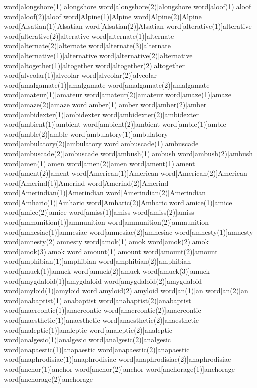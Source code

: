 word[alongshore(1)]{alongshore}
word[alongshore(2)]{alongshore}
word[aloof(1)]{aloof}
word[aloof(2)]{aloof}
word[Alpine(1)]{Alpine}
word[Alpine(2)]{Alpine}
word[Alsatian(1)]{Alsatian}
word[Alsatian(2)]{Alsatian}
word[alterative(1)]{alterative}
word[alterative(2)]{alterative}
word[alternate(1)]{alternate}
word[alternate(2)]{alternate}
word[alternate(3)]{alternate}
word[alternative(1)]{alternative}
word[alternative(2)]{alternative}
word[altogether(1)]{altogether}
word[altogether(2)]{altogether}
word[alveolar(1)]{alveolar}
word[alveolar(2)]{alveolar}
word[amalgamate(1)]{amalgamate}
word[amalgamate(2)]{amalgamate}
word[amateur(1)]{amateur}
word[amateur(2)]{amateur}
word[amaze(1)]{amaze}
word[amaze(2)]{amaze}
word[amber(1)]{amber}
word[amber(2)]{amber}
word[ambidexter(1)]{ambidexter}
word[ambidexter(2)]{ambidexter}
word[ambient(1)]{ambient}
word[ambient(2)]{ambient}
word[amble(1)]{amble}
word[amble(2)]{amble}
word[ambulatory(1)]{ambulatory}
word[ambulatory(2)]{ambulatory}
word[ambuscade(1)]{ambuscade}
word[ambuscade(2)]{ambuscade}
word[ambush(1)]{ambush}
word[ambush(2)]{ambush}
word[amen(1)]{amen}
word[amen(2)]{amen}
word[ament(1)]{ament}
word[ament(2)]{ament}
word[American(1)]{American}
word[American(2)]{American}
word[Amerind(1)]{Amerind}
word[Amerind(2)]{Amerind}
word[Amerindian(1)]{Amerindian}
word[Amerindian(2)]{Amerindian}
word[Amharic(1)]{Amharic}
word[Amharic(2)]{Amharic}
word[amice(1)]{amice}
word[amice(2)]{amice}
word[amiss(1)]{amiss}
word[amiss(2)]{amiss}
word[ammunition(1)]{ammunition}
word[ammunition(2)]{ammunition}
word[amnesiac(1)]{amnesiac}
word[amnesiac(2)]{amnesiac}
word[amnesty(1)]{amnesty}
word[amnesty(2)]{amnesty}
word[amok(1)]{amok}
word[amok(2)]{amok}
word[amok(3)]{amok}
word[amount(1)]{amount}
word[amount(2)]{amount}
word[amphibian(1)]{amphibian}
word[amphibian(2)]{amphibian}
word[amuck(1)]{amuck}
word[amuck(2)]{amuck}
word[amuck(3)]{amuck}
word[amygdaloid(1)]{amygdaloid}
word[amygdaloid(2)]{amygdaloid}
word[amyloid(1)]{amyloid}
word[amyloid(2)]{amyloid}
word[an(1)]{an}
word[an(2)]{an}
word[anabaptist(1)]{anabaptist}
word[anabaptist(2)]{anabaptist}
word[anacreontic(1)]{anacreontic}
word[anacreontic(2)]{anacreontic}
word[anaesthetic(1)]{anaesthetic}
word[anaesthetic(2)]{anaesthetic}
word[analeptic(1)]{analeptic}
word[analeptic(2)]{analeptic}
word[analgesic(1)]{analgesic}
word[analgesic(2)]{analgesic}
word[anapaestic(1)]{anapaestic}
word[anapaestic(2)]{anapaestic}
word[anaphrodisiac(1)]{anaphrodisiac}
word[anaphrodisiac(2)]{anaphrodisiac}
word[anchor(1)]{anchor}
word[anchor(2)]{anchor}
word[anchorage(1)]{anchorage}
word[anchorage(2)]{anchorage}
